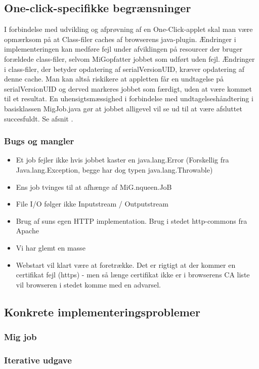 \documentclass[final,a4paper,10pt]{article}
\newcommand{\mig}{MiG}
\newcommand{\oc}{One-Click}
\begin{document}
\subsection{One-click-specifikke begrænsninger}

I forbindelse med udvikling og afprøvning af en \oc-applet skal man være opmærksom på at Class-filer caches af browserens java-plugin. Ændringer i implementeringen kan medføre fejl under afviklingen på resourcer der bruger forældede class-filer, selvom \mig opfatter jobbet som udført uden fejl. Ændringer i class-filer, der betyder opdatering af serialVersionUID, kræver opdatering af denne cache. Man kan altså riskikere at appletten får en undtagelse på serialVersionUID og derved markeres jobbet som færdigt, uden at være kommet til et resultat. En uhensigtsmæssighed i forbindelse med undtagelseshåndtering i basisklassen MigJob.java gør at jobbet alligevel vil se ud til at være afsluttet succesfuldt. Se afsnit \cite{bugs}. 


\subsubsection{Bugs og mangler}\label{bugs}
\begin{itemize}
	\item Et job fejler ikke hvis jobbet kaster en java.lang.Error (Forskellig fra Java.lang.Exception, begge har dog typen java.lang.Throwable)
	\item Ens job tvinges til at afhænge af MiG.nqueen.JoB
	\item File I/O følger ikke Inputstream / Outputstream	
	\item Brug af suns egen HTTP implementation. Brug i stedet http-commons fra Apache
	\item Vi har glemt en masse 
	\item Webstart vil klart være at foretrække. Det er rigtigt at der kommer en certifikat fejl (https) - men så længe certifikat ikke er i browserens CA liste vil browseren i stedet komme med en advarsel.
\end{itemize}


\subsection{Konkrete implementeringsproblemer}
\subsubsection{Mig job}\label{label}
\subsubsection{Iterative udgave}
\end{document}
